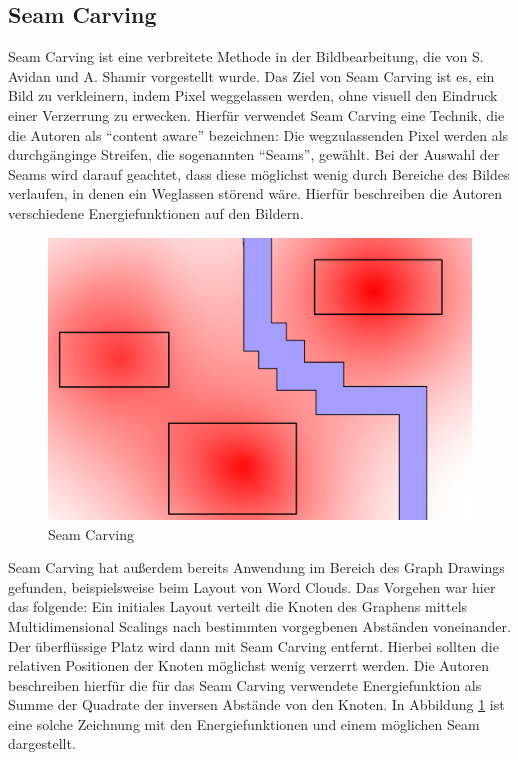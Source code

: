 \subsection{Seam Carving}

Seam Carving ist eine verbreitete Methode in der Bildbearbeitung, die von S. Avidan und A. Shamir vorgestellt wurde.\cite{avidan2007seam} Das Ziel von Seam Carving ist es, ein Bild zu verkleinern, indem Pixel weggelassen werden, ohne visuell den Eindruck einer Verzerrung zu erwecken. Hierfür verwendet Seam Carving eine Technik, die die Autoren als "`content aware"' bezeichnen: Die wegzulassenden Pixel werden als durchgänginge Streifen, die sogenannten "`Seams"', gewählt. Bei der Auswahl der Seams wird darauf geachtet, dass diese möglichst wenig durch Bereiche des Bildes verlaufen, in denen ein Weglassen störend wäre. Hierfür beschreiben die Autoren verschiedene Energiefunktionen auf den Bildern.

\begin{figure}
	\centering
	\includegraphics{figures/seamcarving.png}
	\caption{Seam Carving}
	\label{fig:seamcarving}
\end{figure}

Seam Carving hat außerdem bereits Anwendung im Bereich des Graph Drawings gefunden, beispielsweise beim Layout von Word Clouds.\cite{wu2011semantic} Das Vorgehen war hier das folgende: Ein initiales Layout verteilt die Knoten des Graphens mittels Multidimensional Scalings nach bestimmten vorgegbenen Abständen voneinander. Der überflüssige Platz wird dann mit Seam Carving entfernt. Hierbei sollten die relativen Positionen der Knoten möglichst wenig verzerrt werden. Die Autoren beschreiben hierfür die für das Seam Carving verwendete Energiefunktion als Summe der Quadrate der inversen Abstände von den Knoten. In Abbildung \ref{fig:seamcarving} ist eine solche Zeichnung mit den Energiefunktionen und einem möglichen Seam dargestellt.

